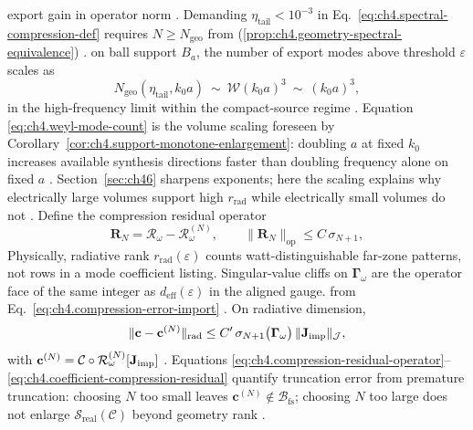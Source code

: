 export gain in operator norm \cite{harrington2001}. Demanding \(\eta_{\mathrm{tail}}<10^{-3}\) in
Eq.~\eqref{eq:ch4.spectral-compression-def} requires \(N\ge N_{\mathrm{geo}}\) from (\ref{prop:ch4.geometry-spectral-equivalence}) \cite{hansen1988}.
on ball support \(B_{a}\), the number of export modes above threshold \(\varepsilon\) scales as
\begin{equation}
\label{eq:ch4.weyl-mode-count}
N_{\mathrm{geo}}(\eta_{\mathrm{tail}},k_{0}a)
\ \sim\
\mathcal{W}(k_{0}a)^{3}
\ \sim\
(k_{0}a)^{3},
\end{equation}
in the high-frequency limit within the compact-source regime \cite{stratton1941}. Equation
\eqref{eq:ch4.weyl-mode-count} is the volume scaling foreseen by Corollary~\ref{cor:ch4.support-monotone-enlargement}:
doubling \(a\) at fixed \(k_{0}\) increases available synthesis directions faster than doubling frequency alone on fixed
\(a\) \cite{devaney2004}. Section~\ref{sec:ch46} sharpens exponents; here the scaling explains why
electrically large volumes support high \(r_{\mathrm{rad}}\) while electrically small volumes do not
\cite{hansen1988}.
Define the compression residual operator
\begin{equation}
\label{eq:ch4.compression-residual-operator}
\mathbf{R}_{N}
=
\mathcal{R}_\omega-\mathcal{R}_\omega^{(N)},
\qquad
\|\mathbf{R}_{N}\|_{\mathrm{op}}
\le
C\,\sigma_{N+1},
\end{equation}
Physically, radiative rank $r_{\mathrm{rad}}(\varepsilon)$ counts watt-distinguishable far-zone patterns, not rows in a mode coefficient listing. Singular-value cliffs on $\boldsymbol{\Gamma}_\omega$ are the operator face of the same integer as $d_{\mathrm{eff}}(\varepsilon)$ in the aligned gauge. \cite{hansen1988}
from Eq.~\eqref{eq:ch4.compression-error-import} \cite{stratton1941}. On radiative dimension,
\begin{equation}
\label{eq:ch4.coefficient-compression-residual}
\|\mathbf{c}-\mathbf{c}^{(N)}\|_{\mathrm{rad}}
\le
C'\,\sigma_{N+1}\big(\boldsymbol{\Gamma}_\omega\big)\,\|\mathbf{J}_{\mathrm{imp}}\|_{\mathcal{J}},
\end{equation}
with \(\mathbf{c}^{(N)}=\mathcal{C}\circ\mathcal{R}_\omega^{(N)}[\mathbf{J}_{\mathrm{imp}}]\) \cite{hansen1988}. Equations
\eqref{eq:ch4.compression-residual-operator}--\eqref{eq:ch4.coefficient-compression-residual} quantify truncation error from
premature truncation: choosing \(N\) too small leaves \(\mathbf{c}^{(N)}\notin\mathcal{B}_{\mathrm{fs}}\); choosing \(N\)
too large does not enlarge \(\mathcal{S}_{\mathrm{real}}(\mathcal{C})\) beyond geometry rank \cite{harrington2001}.

